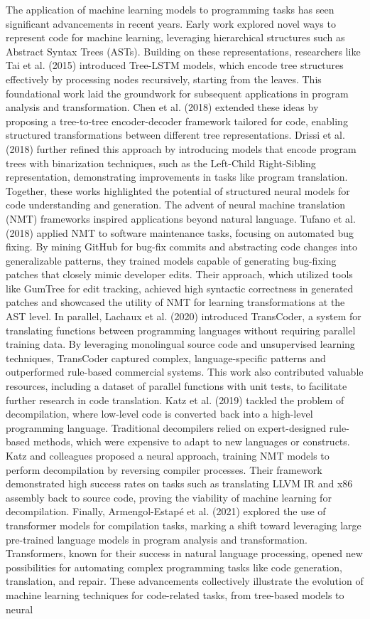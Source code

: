 \documentclass{dhbenelux}
\begin{document}
The application of machine learning models to programming tasks has seen significant advancements in recent years. Early work explored novel ways to represent code for machine learning, leveraging hierarchical structures such as Abstract Syntax Trees (ASTs). Building on these representations, researchers like Tai et al. (2015) introduced Tree-LSTM models, which encode tree structures effectively by processing nodes recursively, starting from the leaves. This foundational work laid the groundwork for subsequent applications in program analysis and transformation. Chen et al. (2018) extended these ideas by proposing a tree-to-tree encoder-decoder framework tailored for code, enabling structured transformations between different tree representations. Drissi et al. (2018) further refined this approach by introducing models that encode program trees with binarization techniques, such as the Left-Child Right-Sibling representation, demonstrating improvements in tasks like program translation. Together, these works highlighted the potential of structured neural models for code understanding and generation. The advent of neural machine translation (NMT) frameworks inspired applications beyond natural language. Tufano et al. (2018) applied NMT to software maintenance tasks, focusing on automated bug fixing. By mining GitHub for bug-fix commits and abstracting code changes into generalizable patterns, they trained models capable of generating bug-fixing patches that closely mimic developer edits. Their approach, which utilized tools like GumTree for edit tracking, achieved high syntactic correctness in generated patches and showcased the utility of NMT for learning transformations at the AST level. In parallel, Lachaux et al. (2020) introduced TransCoder, a system for translating functions between programming languages without requiring parallel training data. By leveraging monolingual source code and unsupervised learning techniques, TransCoder captured complex, language-specific patterns and outperformed rule-based commercial systems. This work also contributed valuable resources, including a dataset of parallel functions with unit tests, to facilitate further research in code translation. Katz et al. (2019) tackled the problem of decompilation, where low-level code is converted back into a high-level programming language. Traditional decompilers relied on expert-designed rule-based methods, which were expensive to adapt to new languages or constructs. Katz and colleagues proposed a neural approach, training NMT models to perform decompilation by reversing compiler processes. Their framework demonstrated high success rates on tasks such as translating LLVM IR and x86 assembly back to source code, proving the viability of machine learning for decompilation. Finally, Armengol-Estapé et al. (2021) explored the use of transformer models for compilation tasks, marking a shift toward leveraging large pre-trained language models in program analysis and transformation. Transformers, known for their success in natural language processing, opened new possibilities for automating complex programming tasks like code generation, translation, and repair. These advancements collectively illustrate the evolution of machine learning techniques for code-related tasks, from tree-based models to neural 
\end{document}
